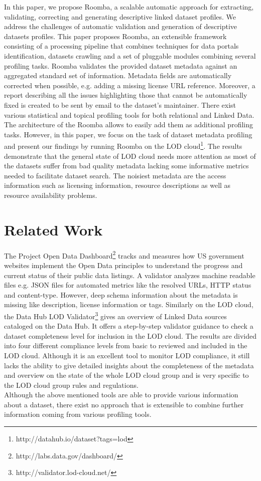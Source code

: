 \documentclass{sig-alternate}
\begin{document}
In this paper, we propose Roomba, a scalable automatic approach for extracting, validating, correcting and generating descriptive linked dataset profiles. We address the challenges of automatic validation and generation of descriptive datasets profiles. This paper proposes Roomba, an extensible framework consisting of a processing pipeline that combines techniques for data portals identification, datasets crawling and a set of pluggable modules combining several profiling tasks. Roomba validates the provided dataset metadata against an aggregated standard set of information. Metadata fields are automatically corrected when possible, e.g. adding a missing license URL reference. Moreover, a report describing all the issues highlighting those that cannot be automatically fixed is created to be sent by email to the dataset's maintainer. There exist various statistical and topical profiling tools for both relational and Linked Data. The architecture of the Roomba allows to easily add them as additional profiling tasks. However, in this paper, we focus on the task of dataset metadata profiling and present our findings by running Roomba on the LOD cloud\footnote{http://datahub.io/dataset?tags=lod}. The results demonstrate that the general state of LOD cloud needs more attention as most of the datasets suffer from bad quality metadata lacking some informative metrics needed to facilitate dataset search. The noisiest metadata are the access information such as licensing information, resource descriptions as well as resource availability problems.

\section{Related Work}
The Project Open Data Dashboard\footnote{http://labs.data.gov/dashboard/} tracks and measures how US government websites implement the Open Data principles to understand the progress and current status of their public data listings. A validator analyzes machine readable files e.g. JSON files for automated metrics like the resolved URLs, HTTP status and content-type. However, deep schema information about the metadata is missing like description, license information or tags. Similarly on the LOD cloud, the Data Hub LOD Validator\footnote{http://validator.lod-cloud.net/} gives an overview of Linked Data sources cataloged on the Data Hub. It offers a step-by-step validator guidance to check a dataset completeness level for inclusion in the LOD cloud. The results are divided into four different compliance levels from basic to reviewed and included in the LOD cloud. Although it is an excellent tool to monitor LOD compliance, it still lacks the ability to give detailed insights about the completeness of the metadata and overview on the state of the whole LOD cloud group and is very specific to the LOD cloud group rules and regulations.\\
Although the above mentioned tools are able to provide various information about a dataset, there exist no approach that is extensible to combine further information coming from various profiling tools.
\end{document}
